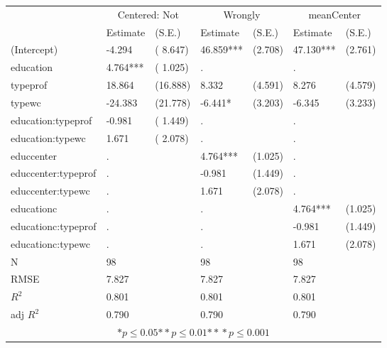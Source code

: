\begin{tabular}{*{7}{l}}
\hline
                  & \multicolumn{2}{c}{Centered: Not} & \multicolumn{2}{c}{Wrongly} & \multicolumn{2}{c}{meanCenter}   \tabularnewline
                   &Estimate  &(S.E.)    &Estimate  &(S.E.)    &Estimate  &(S.E.)  \tabularnewline
 \hline
 \hline
   (Intercept)     &-4.294   &   ( 8.647) &46.859***   &   (2.708) &47.130***   &   (2.761) \tabularnewline
   education       &4.764***   &   ( 1.025)   & .        &           & .        &         \tabularnewline
   typeprof        &18.864   &   (16.888) &8.332   &   (4.591) &8.276   &   (4.579) \tabularnewline
   typewc          &-24.383   &   (21.778) &-6.441*   &   (3.203) &-6.345   &   (3.233) \tabularnewline
   education:typeprof    &-0.981   &   ( 1.449)   & .        &           & .        &         \tabularnewline
   education:typewc    &1.671   &   ( 2.078)   & .        &           & .        &         \tabularnewline
   educcenter        & .        &         &4.764***   &   (1.025)   & .        &         \tabularnewline
   educcenter:typeprof      & .        &         &-0.981   &   (1.449)   & .        &         \tabularnewline
   educcenter:typewc      & .        &         &1.671   &   (2.078)   & .        &         \tabularnewline
   educationc        & .        &           & .        &         &4.764***   &   (1.025) \tabularnewline
   educationc:typeprof      & .        &           & .        &         &-0.981   &   (1.449) \tabularnewline
   educationc:typewc      & .        &           & .        &         &1.671   &   (2.078) \tabularnewline
 \hline
 N                 &98       &        &98       &        &98       &        \tabularnewline
 RMSE             &7.827         & &7.827         & &7.827         & \tabularnewline
 $R^2$             &0.801         & &0.801         & &0.801         & \tabularnewline
 adj $R^2$         &0.790         & &0.790         & &0.790         & \tabularnewline
 \hline
\hline
 
 \multicolumn{7}{c}{${*  p}\le 0.05$${*\!\!*  p}\le 0.01$${*\!\!*\!\!*  p}\le 0.001$}\tabularnewline
 \end{tabular}
